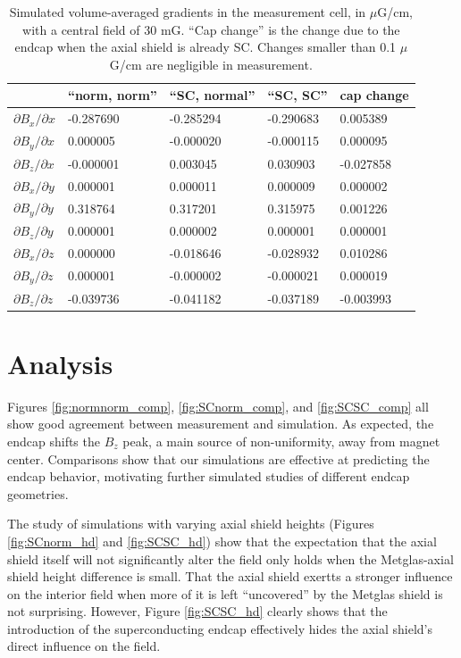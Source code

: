 \documentclass[twocolumn,aps,prb,citeautoscript]{revtex4-1}
\begin{document}
\begin{table}
\begin{tabular}{R{2.8cm}|R{2.8cm}|R{2.8cm}|R{2.8cm}|R{2.8cm}}
    & \textbf{``norm, norm''} & \textbf{``SC, normal''} & \textbf{``SC, SC''} & \textbf{cap change}\\\hline
    \textbf{$\partial B_x/\partial x$} & -0.287690 & -0.285294 & -0.290683 & 0.005389 \\
    \textbf{$\partial B_y/\partial x$} & 0.000005 & -0.000020 & -0.000115 & 0.000095 \\
    \textbf{$\partial B_z/\partial x$} & -0.000001 & 0.003045 & 0.030903 & -0.027858 \\
    \textbf{$\partial B_x/\partial y$} & 0.000001 & 0.000011 & 0.000009 & 0.000002 \\
    \textbf{$\partial B_y/\partial y$} & 0.318764 & 0.317201 & 0.315975 & 0.001226 \\
    \textbf{$\partial B_z/\partial y$} & 0.000001 & 0.000002 & 0.000001 & 0.000001 \\
    \textbf{$\partial B_x/\partial z$} & 0.000000 & -0.018646 & -0.028932 & 0.010286 \\
    \textbf{$\partial B_y/\partial z$} & 0.000001 & -0.000002 & -0.000021 & 0.000019 \\
    \textbf{$\partial B_z/\partial z$} & -0.039736 & -0.041182 & -0.037189 & -0.003993 \\
\end{tabular}
\caption{\label{tbl:gradients} Simulated volume-averaged gradients in the measurement cell, in $\mu$G/cm, with a
central field of 30 mG. ``Cap change'' is the change due to the endcap when the axial shield is already SC.
Changes smaller than 0.1 $\mu$G/cm are negligible in measurement.}
\end{table}

\section{Analysis}

Figures \ref{fig:normnorm_comp}, \ref{fig:SCnorm_comp}, and \ref{fig:SCSC_comp} all show good agreement between
measurement
and simulation. As expected, the endcap shifts the $B_z$ peak, a main source of non-uniformity, away
from magnet center. Comparisons show that our simulations are effective at predicting the endcap behavior, motivating
further simulated studies of different endcap geometries.

The study of simulations with varying axial shield heights (Figures \ref{fig:SCnorm_hd} and \ref{fig:SCSC_hd})
show that the expectation that the axial shield itself will not significantly alter the field only holds when
the Metglas-axial shield height difference is small. That the axial shield exertts a stronger influence on the interior
field when more of it is left ``uncovered'' by the Metglas shield is not surprising. However, Figure \ref{fig:SCSC_hd}
clearly shows that the introduction of the superconducting endcap effectively hides the axial shield's direct
influence on the field.
\end{document}
